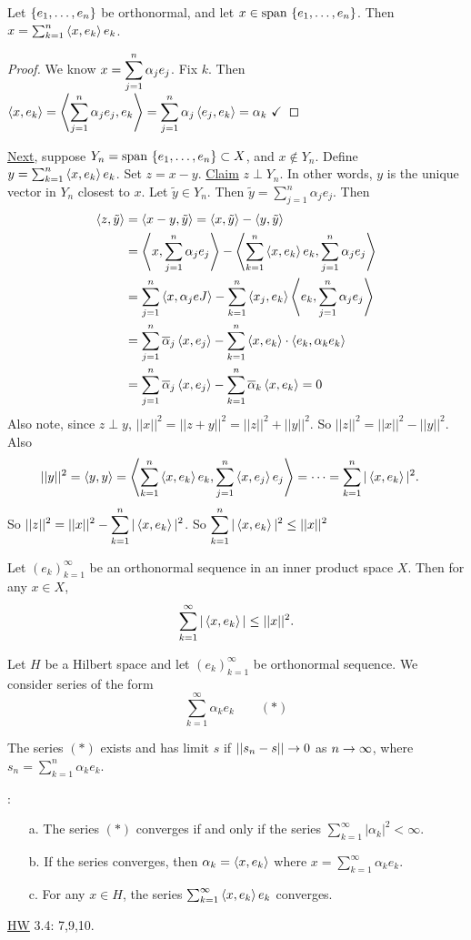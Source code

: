 \documentclass[]{article}
\begin{document}
Let $\left\{ e_1,\dots,e_n \right\}$ be orthonormal, and let $x\in\text{span}\,\left\{ e_1,\dots,e_n \right\}$.
Then $x = \sum_{k=1}^n \left\langle x,e_k \right\rangle e_k$.
\begin{proof}
	We know $\displaystyle x=\sum_{j=1}^n \alpha_je_j$. Fix $k$. Then 
		$\displaystyle \left\langle x,e_k \right\rangle = \left\langle \sum_{j=1}^n \alpha_je_j,e_k \right\rangle
					= \sum_{j=1}^n \alpha_j\left\langle e_j,e_k \right\rangle
					= \alpha_k \ \checkmark $
\end{proof}
\newpage
\ul{Next}, suppose $Y_n = \text{span}\,\left\{ e_1,\dots,e_n \right\}\subset X$, and $x\notin Y_n$.
Define $y = \sum_{k=1}^n \left\langle x,e_k \right\rangle e_k$. Set $z=x-y$.
\ul{Claim} $z\perp Y_n$. In other words, $y$ is the unique vector in $Y_n$ closest to $x$.
Let $\tilde y\in Y_n$. Then $\tilde y=\sum_{j=1}^n\alpha_je_j$. Then
\begin{align*}
	\left\langle z,\tilde y \right\rangle &= \left\langle x-y,\tilde y \right\rangle = \left\langle x,\tilde y \right\rangle - \left\langle y,\tilde y \right\rangle \\
					 &= \left\langle x,\sum_{j=1}^n\alpha_je_j \right\rangle - \left\langle \sum_{k=1}^n \left\langle x,e_k \right\rangle e_k,\sum_{j=1}^n \alpha_je_j \right\rangle \\
					 &= \sum_{j=1}^n \left\langle x,\alpha_jeJ \right\rangle - \sum_{k=1}^n \left\langle x_j,e_k \right\rangle \left\langle e_k,\sum_{j=1}^n\alpha_je_j \right\rangle \\
					 &= \sum_{j=1}^n \overline{\alpha}_j\left\langle x,e_j \right\rangle - \sum_{k=1}^n\left\langle x,e_k \right\rangle\cdot\left\langle e_k,\alpha_ke_k \right\rangle \\
					 &= \sum_{j=1}^n \overline{\alpha}_j\left\langle x,e_j \right\rangle - \sum_{k=1}^n \overline{\alpha}_k \left\langle x,e_k \right\rangle = 0
\end{align*}
Also note, since $z\perp y$, $||x||^2 = ||z+y||^2 = ||z||^2 + ||y||^2$.
So $||z||^2 = ||x||^2 - ||y||^2$. Also
\begin{align*}
	||y||^2 &= \left\langle y,y \right\rangle = \left\langle \sum_{k=1}^n\left\langle x,e_k \right\rangle e_k,\sum_{j=1}^n\left\langle x,e_j \right\rangle e_j \right\rangle
			=\dots= \sum_{k=1}^n |\left\langle x,e_k \right\rangle|^2.
\end{align*}
So $\displaystyle||z||^2 = ||x||^2 - \sum_{k=1}^n|\left\langle x,e_k \right\rangle|^2$.
So $\displaystyle\sum_{k=1}^n |\left\langle x,e_k \right\rangle|^2 \leq ||x||^2 $ 
\begin{theorem}
	Let $(e_k)_{k=1}^\infty$ be an orthonormal sequence in an inner product space $X$.
	Then for any $x\in X$, $$\sum_{k=1}^\infty |\left\langle x,e_k \right\rangle| \leq ||x||^2.$$
\end{theorem}

Let $H$ be a Hilbert space and let $(e_k)_{k=1}^\infty$ be orthonormal sequence.
We consider series of the form $$\sum_{k=1}^\infty \alpha_k e_k \qquad (*) $$
\begin{definition}
	The series $(*)$ exists and has limit $s$ if $||s_n-s||\rightarrow0$ as $n\rightarrow\infty$, where $s_n = \sum_{k=1}^n \alpha_ke_k$.
\end{definition}
\begin{theorem}:
	\begin{enumerate}
		\item[a.] The series $(*)$ converges if and only if the series $\sum_{k=1}^\infty |\alpha_k|^2<\infty$.
		\item[b.] If the series converges, then $\alpha_k = \left\langle x,e_k \right\rangle$ where $x=\sum_{k=1}^\infty \alpha_ke_k$.
		\item[c.] For any $x\in H$, the series $\sum_{k=1}^\infty \left\langle x,e_k \right\rangle e_k$ converges.
	\end{enumerate}
\end{theorem}
\ul{HW} 3.4: 7,9,10.
\end{document}
